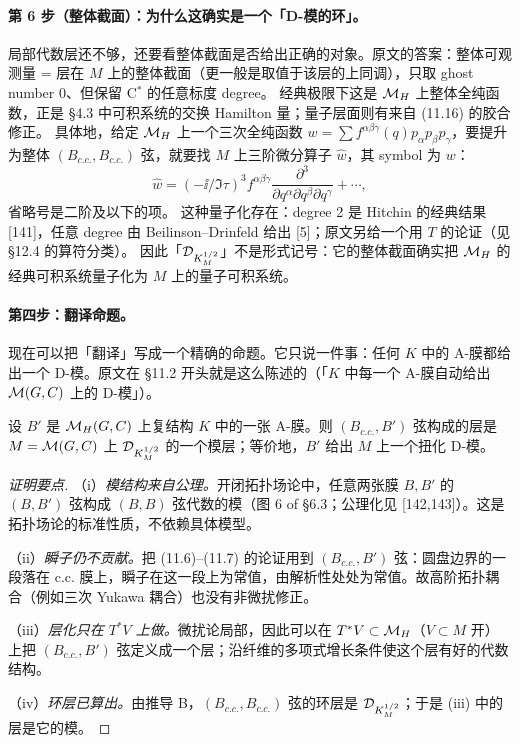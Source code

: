 \paragraph{第 6 步（整体截面）：为什么这确实是一个「D-模的环」。}局部代数层还不够，还要看整体截面是否给出正确的对象。原文的答案：整体可观测量 = 层在 \(M\) 上的整体截面（更一般是取值于该层的上同调），只取 ghost number 0、但保留 C$^*$ 的任意标度 degree。\pA{} 经典极限下这是 \(\mathcal{M}_H\) 上整体全纯函数，正是 \S4.3 中可积系统的交换 Hamilton 量；量子层面则有来自 (11.16) 的胶合修正。\pA{} 具体地，给定 \(\mathcal{M}_H\) 上一个三次全纯函数 \(w=\sum f^{\alpha\beta\gamma}(q)p_\alpha p_\beta p_\gamma\)，要提升为整体 \((B_{c.c.},B_{c.c.})\) 弦，就要找 \(M\) 上三阶微分算子 \(\hat w\)，其 symbol 为 \(w\)：
\begin{equation}
\hat w=(-\ii/\Im\tau)^3 f^{\alpha\beta\gamma}\frac{\partial^3}{\partial q^\alpha\partial q^\beta\partial q^\gamma}+\cdots,
\label{eq:quantize-w}
\end{equation}
省略号是二阶及以下的项。\pA{} 这种量子化存在：degree 2 是 Hitchin 的经典结果 [141]，任意 degree 由 Beilinson--Drinfeld 给出 [5]；原文另给一个用 \(T\) 的论证（见 \S12.4 的算符分类）。\pA{} 因此「\(\mathcal{D}_{K_M^{1/2}}\)」不是形式记号：它的整体截面确实把 \(\mathcal{M}_H\) 的经典可积系统量子化为 \(M\) 上的量子可积系统。\pA{}

\paragraph{第四步：翻译命题。}现在可以把「翻译」写成一个精确的命题。它只说一件事：任何 \(K\) 中的 A-膜都给出一个 D-模。原文在 \S11.2 开头就是这么陈述的（「\(K\) 中每一个 A-膜自动给出 \(\mathcal{M}(G,C)\) 上的 D-模」）。\pA{}

\begin{proposition}[膜到 D-模的翻译]
\label{prop:translation}
设 \(B'\) 是 \(\mathcal{M}_H(G,C)\) 上复结构 \(K\) 中的一张 A-膜。则 \((B_{c.c.},B')\) 弦构成的层是 \(M=\mathcal{M}(G,C)\) 上 \(\mathcal{D}_{K_M^{1/2}}\) 的一个模层；等价地，\(B'\) 给出 \(M\) 上一个扭化 D-模。
\end{proposition}

\begin{proof}[证明要点]
（i）\emph{模结构来自公理。}开闭拓扑场论中，任意两张膜 \(B,B'\) 的 \((B,B')\) 弦构成 \((B,B)\) 弦代数的模（图 6 of \S6.3；公理化见 [142,143]）。这是拓扑场论的标准性质，不依赖具体模型。\pA{}

（ii）\emph{瞬子仍不贡献。}把 (11.6)--(11.7) 的论证用到 \((B_{c.c.},B')\) 弦：圆盘边界的一段落在 c.c. 膜上，瞬子在这一段上为常值，由解析性处处为常值。故高阶拓扑耦合（例如三次 Yukawa 耦合）也没有非微扰修正。\pA{}

（iii）\emph{层化只在 \(T^*V\) 上做。}微扰论局部，因此可以在 \(T^*V\subset\mathcal{M}_H\)（\(V\subset M\) 开）上把 \((B_{c.c.},B')\) 弦定义成一个层；沿纤维的多项式增长条件使这个层有好的代数结构。\pA{}

（iv）\emph{环层已算出。}由推导 B，\((B_{c.c.},B_{c.c.})\) 弦的环层是 \(\mathcal{D}_{K_M^{1/2}}\)；于是 (iii) 中的层是它的模。\pA{}
\end{proof}


